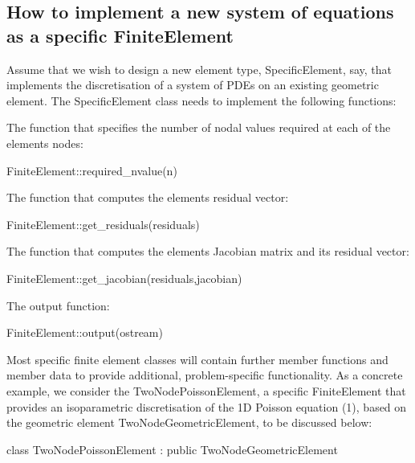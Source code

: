 \hypertarget{index_FEequations}{}\subsection{How to implement a new system of equations as a specific Finite\+Element}\label{index_FEequations}
Assume that we wish to design a new element type, {\ttfamily Specific\+Element}, say, that implements the discretisation of a system of P\+D\+Es on an existing geometric element. The {\ttfamily Specific\+Element} class needs to implement the following functions\+:
\begin{DoxyItemize}
\item The function that specifies the number of nodal values required at each of the element\textquotesingle{}s nodes\+: 
\begin{DoxyCode}
FiniteElement::required\_nvalue(n) 
\end{DoxyCode}

\item The function that computes the element\textquotesingle{}s residual vector\+: 
\begin{DoxyCode}
FiniteElement::get\_residuals(residuals) 
\end{DoxyCode}

\item The function that computes the element\textquotesingle{}s Jacobian matrix and its residual vector\+: 
\begin{DoxyCode}
FiniteElement::get\_jacobian(residuals,jacobian) 
\end{DoxyCode}

\item The output function\+: 
\begin{DoxyCode}
FiniteElement::output(ostream) 
\end{DoxyCode}

\end{DoxyItemize}

Most specific finite element classes will contain further member functions and member data to provide additional, problem-\/specific functionality. As a concrete example, we consider the {\ttfamily Two\+Node\+Poisson\+Element}, a specific {\ttfamily Finite\+Element} that provides an isoparametric discretisation of the 1D Poisson equation (1), based on the geometric element {\ttfamily Two\+Node\+Geometric\+Element}, to be discussed below\+:  
\begin{DoxyCodeInclude}
\textcolor{keyword}{class }TwoNodePoissonElement : \textcolor{keyword}{public} TwoNodeGeometricElement

\end{DoxyCodeInclude}



